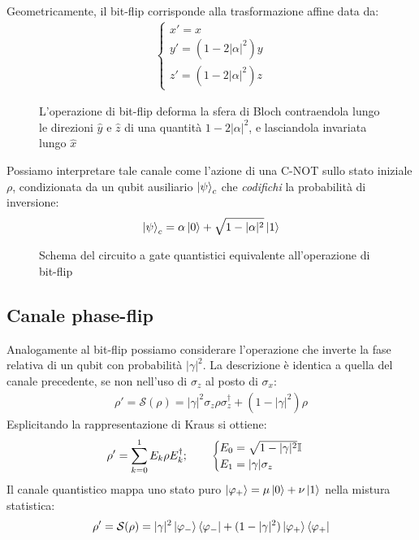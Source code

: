\documentclass[../../InformazioneQuantistica.tex]{subfiles}
\begin{document}
Geometricamente, il bit-flip corrisponde alla trasformazione affine data da:
\begin{align*}
\begin{cases}
x'=x\\
y' = (1-2|\alpha|^2) y\\
z'=(1-2|\alpha|^2)z
\end{cases}
\end{align*}

\begin{figure}[H]
\centering

\caption{L'operazione di bit-flip deforma la sfera di Bloch contraendola lungo le direzioni $\hat{y}$ e $\hat{z}$ di una quantità $1-2|\alpha|^2$, e lasciandola invariata lungo $\hat{x}$\label{fig:bit-flip-geometrica}}
\end{figure}

Possiamo interpretare tale canale come l'azione di una C-NOT sullo stato iniziale $\rho$, condizionata da un qubit ausiliario $\Ket{\psi}_c$ che \textit{codifichi} la probabilità di inversione:
\begin{align}
    \Ket{\psi}_c = \alpha\Ket{0} + \sqrt{1-|\alpha|^2} \Ket{1}
\end{align}

\begin{figure}[H]
\centering

\caption{Schema del circuito a gate quantistici equivalente all'operazione di bit-flip\label{fig:bit-flip-gate}}
\end{figure}

\subsection{Canale phase-flip}
Analogamente al bit-flip possiamo considerare l'operazione che inverte la fase relativa di un qubit con probabilità $|\gamma|^2$. La descrizione è identica a quella del canale precedente, se non nell'uso di $\sigma_z$ al posto di $\sigma_x$:
\begin{align*}
\rho' = \mathcal{S}(\rho) = |\gamma|^2 \sigma_z \rho \sigma_z^\dag + (1-|\gamma|^2)\rho
\end{align*}
Esplicitando la rappresentazione di Kraus si ottiene:
\begin{align}\label{eqn:kraus-phase-flip}
    \rho' = \sum_{k=0}^{1} E_k \rho E_k^\dag; \qquad \begin{cases}
    E_0 = \sqrt{1-|\gamma|^2} \mathbb{I}\\
    E_1 = |\gamma|\sigma_z
    \end{cases}
\end{align}
Il canale quantistico mappa uno stato puro $\Ket{\varphi_+} = \mu\Ket{0} + \nu \Ket{1}$ nella mistura statistica:
\begin{align*}
    \rho' = \mathcal{S}(\rho) = |\gamma|^2 \Ket{\varphi_-}\Bra{\varphi_-} + (1-|\gamma|^2) \Ket{\varphi_+}\Bra{\varphi_+}
\end{align*}
\end{document}
